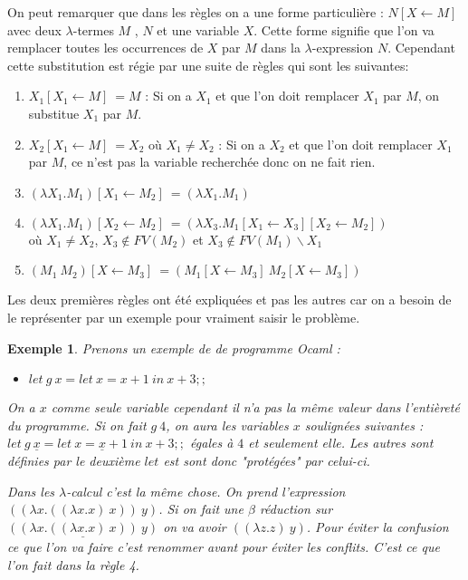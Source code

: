 \documentclass[10pt,a4paper]{report}
\newtheorem{ex}{Exemple}
\begin{document}
	
	On peut remarquer que dans les règles on a une forme particulière : $N [X \leftarrow M]$ avec deux $\lambda$-termes $M$ ,
	$N$ et une variable $X$. Cette forme signifie que l'on va remplacer toutes les occurrences de $X$ par $M$ dans la $\lambda$-expression $N$.
	Cependant cette substitution est régie par une suite de règles qui sont les suivantes: 
	\begin{enumerate}
		\item $X_{1}[X_{1} \leftarrow M]~= M$ : Si on a $X_{1}$ et que l'on doit remplacer $X_{1}$ par $M$, on substitue $X_{1}$ par $M$.
		\item $X_{2}[X_{1} \leftarrow M]~= X_{2}$ où $X_{1}\neq X_{2}$ : Si on a $X_{2}$ et que l'on doit remplacer $X_{1}$ par $M$, ce n'est pas la variable recherchée donc on ne fait rien. 
		\item $(\lambda X_{1}.M_{1})[X_{1} \leftarrow M_{2}]~= (\lambda X_{1}.M_{1})$
		\item $(\lambda X_{1}.M_{1})[X_{2} \leftarrow M_{2}]~= (\lambda X_{3}.M_{1}[X_{1} \leftarrow X_{3}][X_{2} \leftarrow M_{2}])$ 
		\\où $X_{1} \neq X_{2}$, $X_{3} \notin FV(M_{2})$ et $X_{3} \notin FV(M_{1})\backslash{X_{1}}$ 
		\item $(M_{1}~M_{2})[X \leftarrow M_{3}]~=(M_{1}[X \leftarrow M_{3}]~M_{2}[X \leftarrow M_{3}])$
	\end{enumerate}
	\medbreak
	
	Les deux premières règles ont été expliquées et pas les autres car on a besoin de le représenter par un exemple pour vraiment saisir le problème.
	\begin{ex}
		Prenons un exemple de de programme Ocaml :
		\begin{itemize}
			\item[] $let~g~x = let~x = x + 1~in~x + 3;;$
		\end{itemize}
		On a $x$ comme seule variable cependant il n'a pas la même valeur dans l'entièreté du programme. Si on fait $g ~4$, on aura les variables $x$ soulignées suivantes : $let~g~\underline{x} = let~x = \underline{x} + 1~in~x + 3;;$ égales à $4$ et seulement elle. Les autres sont définies par le deuxième $let$ est sont donc "protégées" par celui-ci. 
		\medbreak
		
		Dans les $\lambda$-calcul c'est la même chose. On prend l'expression $((\lambda x.((\lambda x.x)~x))~y)$.
		Si on fait une $\beta$ réduction sur  $\underline{((\lambda x.((\lambda x.x)~x))~y)}$ on va avoir  $((\lambda z.z)~y)$. Pour éviter la confusion ce que l'on va faire c'est renommer avant pour éviter les conflits. C'est ce que l'on fait dans la règle 4.
	\end{ex}
	\bigbreak
	
\end{document}
